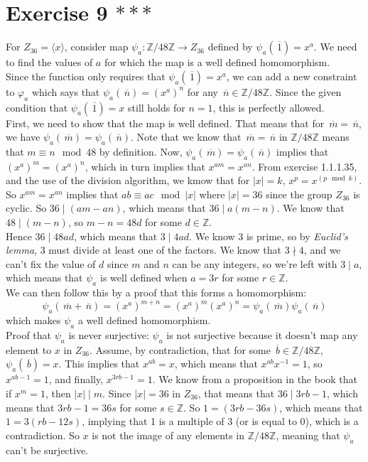 \documentclass{article}
\newcommand{\Z}{\mathbb{Z}}
\newcommand{\olsi}[1]{\,\overline{\!{#1}}}
\begin{document}
    \section*{Exercise 9 $***$}
    For $Z_{36} = \langle x \rangle$,
    consider map $\psi_a: \Z/48\Z \to Z_{36}$
    defined by $\psi_a(\olsi{1}) = x^a$.
    We need to find the values of $a$ for which the map is a well
    defined homomorphism. \\
    Since the function only requires that $\psi_a(\olsi{1}) = x^a$,
    we can add a new constraint to $\varphi_a$ which says that 
    $\psi_a(\olsi{n}) = (x^a)^n$ for any $\olsi{n} \in \Z/48\Z$.
    Since the given condition that $\psi_a(\olsi{1}) = x$
    still holds for $n = 1$, this is perfectly allowed. \\
    First, we need to show that the map is well defined.
    That means that for $\olsi{m} = \olsi{n}$,
    we have $\psi_a(\olsi{m}) = \psi_a(\olsi{n})$.
    Note that we know that $\olsi{m} = \olsi{n}$ in $\Z/48\Z$
    means that $m \equiv n \mod 48$ by definition.
    Now, $\psi_a(\olsi{m}) = \psi_a(\olsi{n})$
    implies that $(x^a)^m = (x^a)^n$,
    which in turn implies that $x^{am} = x^{an}$.
    From exercise 1.1.1.35, and the use of the division
    algorithm, we kmow that for $|x| = k$, $x^p = x^{(p \mod k)}$.
    So $x^{am} = x^{an}$ implies that $ab \equiv ac \mod |x|$
    where $|x| = 36$ since the group $Z_{36}$ is cyclic.
    So $36 \mid (am - an)$,
    which means that $36 \mid a(m - n)$.
    We know that $48 \mid (m - n)$,
    so $m - n = 48d$ for some $d \in \Z$. \\
    Hence $36 \mid 48ad$,
    which means that $3 \mid 4ad$.
    We know 3 is prime, so by \textit{Euclid's lemma},
    3 must divide at least one of the factors.
    We know that $3 \nmid 4$,
    and we can't fix the value of $d$ since $m$ and $n$
    can be any integers,
    so we're left with $3 \mid a$,
    which means that $\psi_a$ is well defined when
    $a = 3r$ for some $r \in \Z$. \\
    We can then follow this by a proof that this forms a homomorphism:
    \[ \psi_a(\olsi{m} + \olsi{n}) = (x^a)^{m + n}
    = (x^a)^m(x^a)^n
    = \psi_a(\olsi{m})\psi_a(\olsi{n})  \]
    which makes $\psi_a$ a well defined homomorphism. \\
    Proof that $\psi_a$ is never surjective:
    $\psi_a$ is not surjective because it doesn't map any element
    to $x$ in $Z_{36}$.
    Assume, by contradiction, that for some $\olsi{b} \in \Z/48\Z$,
    $\psi_a(\olsi{b}) = x$.
    This implies that $x^{ab} = x$,
    which means that $x^{ab}x^{-1} = 1$,
    so $x^{ab - 1} = 1$,
    and finally, $x^{3rb - 1} = 1$.
    We know from a proposition in the book that
    if $x^m = 1$, then $|x| \mid m$.
    Since $|x| = 36$ in $Z_{36}$,
    that means that $36 \mid 3rb - 1$,
    which means that $3rb - 1 = 36s$ for some $s \in \Z$.
    So $1 = (3rb - 36s)$,
    which means that $1 = 3(rb - 12s)$,
    implying that 1 is a multiple of 3 (or is equal to 0),
    which is a contradiction.
    So $x$ is not the image of any elements in $\Z/48\Z$,
    meaning that $\psi_a$ can't be surjective.
\end{document}
